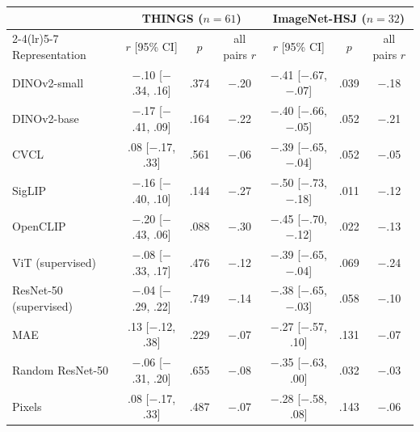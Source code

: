 \begin{tabular}{lcccccc}
\toprule
 & \multicolumn{3}{c}{THINGS ($n = 61$)} & \multicolumn{3}{c}{ImageNet-HSJ ($n = 32$)} \\ \cmidrule(lr){2-4}\cmidrule(lr){5-7}
Representation & $r$ [95\% CI] & $p$ & all pairs $r$ & $r$ [95\% CI] & $p$ & all pairs $r$ \\
\midrule
DINOv2-small & \ensuremath{-}.10 [\ensuremath{-}.34, .16] & .374 & \ensuremath{-}.20 & \ensuremath{-}.41 [\ensuremath{-}.67, \ensuremath{-}.07] & .039 & \ensuremath{-}.18 \\
DINOv2-base & \ensuremath{-}.17 [\ensuremath{-}.41, .09] & .164 & \ensuremath{-}.22 & \ensuremath{-}.40 [\ensuremath{-}.66, \ensuremath{-}.05] & .052 & \ensuremath{-}.21 \\
CVCL & .08 [\ensuremath{-}.17, .33] & .561 & \ensuremath{-}.06 & \ensuremath{-}.39 [\ensuremath{-}.65, \ensuremath{-}.04] & .052 & \ensuremath{-}.05 \\
SigLIP & \ensuremath{-}.16 [\ensuremath{-}.40, .10] & .144 & \ensuremath{-}.27 & \ensuremath{-}.50 [\ensuremath{-}.73, \ensuremath{-}.18] & .011 & \ensuremath{-}.12 \\
OpenCLIP & \ensuremath{-}.20 [\ensuremath{-}.43, .06] & .088 & \ensuremath{-}.30 & \ensuremath{-}.45 [\ensuremath{-}.70, \ensuremath{-}.12] & .022 & \ensuremath{-}.13 \\
ViT (supervised) & \ensuremath{-}.08 [\ensuremath{-}.33, .17] & .476 & \ensuremath{-}.12 & \ensuremath{-}.39 [\ensuremath{-}.65, \ensuremath{-}.04] & .069 & \ensuremath{-}.24 \\
ResNet-50 (supervised) & \ensuremath{-}.04 [\ensuremath{-}.29, .22] & .749 & \ensuremath{-}.14 & \ensuremath{-}.38 [\ensuremath{-}.65, \ensuremath{-}.03] & .058 & \ensuremath{-}.10 \\
MAE & .13 [\ensuremath{-}.12, .38] & .229 & \ensuremath{-}.07 & \ensuremath{-}.27 [\ensuremath{-}.57, .10] & .131 & \ensuremath{-}.07 \\
Random ResNet-50 & \ensuremath{-}.06 [\ensuremath{-}.31, .20] & .655 & \ensuremath{-}.08 & \ensuremath{-}.35 [\ensuremath{-}.63, .00] & .032 & \ensuremath{-}.03 \\
Pixels & .08 [\ensuremath{-}.17, .33] & .487 & \ensuremath{-}.07 & \ensuremath{-}.28 [\ensuremath{-}.58, .08] & .143 & \ensuremath{-}.06 \\
\bottomrule
\end{tabular}
